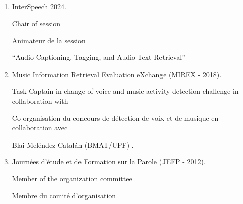 \subsection{\EvalAnim}
\begin{enumerate}[nosep,after=\strut, leftmargin=1em, itemsep=3pt]
\item InterSpeech 2024. \begin{en}Chair of session\end{en}\begin{fr}Animateur de la session \end{fr} ``Audio Captioning, Tagging, and Audio-Text Retrieval''
\item Music Information Retrieval Evaluation eXchange (MIREX - 2018).
\begin{en}Task Captain in change of voice and music activity detection challenge in collaboration with\end{en}
\begin{fr}
Co-organisation du concours de détection de voix et de musique en collaboration avec
\end{fr}
Blai Meléndez-Catalán (BMAT/UPF) .
\item Journées d’étude et de Formation sur la Parole (JEFP - 2012).
\begin{en}Member of the organization committee \end{en}
\begin{fr}Membre du comité d'organisation \end{fr}
\end{enumerate}







\section{\PubSec}

